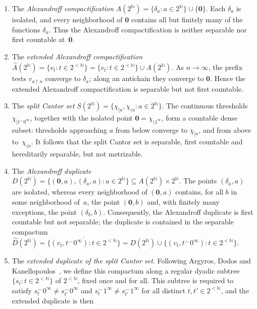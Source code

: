 \documentclass[psamsfonts]{amsart}
\theoremstyle{definition}
\theoremstyle{remark}
\newcommand{\restr}{{\restriction}}
\numberwithin{equation}{section}
\begin{document}
\begin{enumerate}
\item
  The \emph{Alexandroff compactification}
  $A(2^{\mathbb{N}})=\{\delta_a:a\in2^{\mathbb{N}}\}\cup\{\mathbf{0}\}$.
  Each $\delta_a$ is isolated, and every neighborhood of $\mathbf{0}$ contains all but finitely many of the functions $\delta_a$.
  Thus the Alexandroff compactification is neither separable nor first countable at~$\mathbf{0}$.
\item
  The \emph{extended Alexandroff compactification}
  $\hat{A}(2^{\mathbb{N}})=\overline{\{v_t:t\in2^{<\mathbb{N}}\}}=\{v_t:t\in2^{<\mathbb{N}}\}\cup A(2^{\mathbb{N}})$.
  As $n\to\infty$, the prefix tests $v_{a\restr n}$ converge to $\delta_a$;
  along an antichain they converge to $\mathbf{0}$.
  Hence the extended Alexandroff compactification is separable but not first countable.
\item
  The \emph{split Cantor set}
  $S(2^{\mathbb{N}})=\{\chi_{[a},\chi_{(a}:a\in2^{\mathbb{N}}\}$.
  The continuous thresholds $\chi_{[t^\frown0^\infty}$, together with the isolated point $\mathbf{0}=\chi_{(1^\infty}$, form a countable dense subset:
  thresholds approaching $a$ from below converge to $\chi_{[a}$, and from above to~$\chi_{(a}$.
  It follows that the split Cantor set is separable, first countable and hereditarily separable, but not metrizable.
\item
  The \emph{Alexandroff duplicate}
  $D(2^{\mathbb{N}})=\{(\mathbf{0},a),(\delta_a,a):a\in2^{\mathbb{N}}\}\subseteq A(2^{\mathbb{N}})\times2^{\mathbb{N}}$.
  The points $(\delta_a,a)$ are isolated, whereas every neighborhood of $(\mathbf{0},a)$ contains, for all $b$ in some neighborhood of~$a$, the point $(\mathbf{0},b)$ and, with finitely many exceptions, the point $(\delta_b,b)$.
  Consequently, the Alexandroff duplicate is first countable but not separable;
  the duplicate is contained in the separable compactum $\hat{D}(2^{\mathbb{N}})=\overline{\{(v_t,t^\frown0^\infty):t\in2^{<\mathbb{N}}\}}=D(2^{\mathbb{N}})\cup\{(v_t,t^\frown0^\infty):t\in2^{<\mathbb{N}}\}$.
\item
  The \emph{extended duplicate of the split Cantor set}.
  Following Argyros, Dodos and Kanellopoulos~\cite[4.3.7]{argyros2008rosenthal}, we define this compactum along a regular dyadic subtree $\{s_t:t\in2^{<\mathbb{N}}\}$ of $2^{<\mathbb{N}}$, fixed once and for all.
  This subtree is required to satisfy $s_t^\frown0^\infty\neq s_{t'}^\frown0^\infty$ and $s_t^\frown1^\infty\neq s_{t'}^\frown1^\infty$ for all distinct $t,t'\in2^{<\mathbb{N}}$, and the extended duplicate is then

\end{enumerate}
\end{document}
